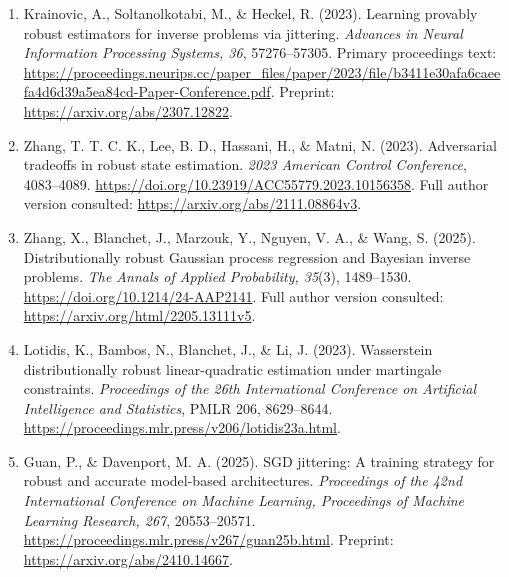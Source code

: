\documentclass[11pt,a4paper]{article}
\begin{document}
\begin{enumerate}
\def\labelenumi{\arabic{enumi}.}
\item
  Krainovic, A., Soltanolkotabi, M., \& Heckel, R. (2023). Learning
  provably robust estimators for inverse problems via jittering.
  \emph{Advances in Neural Information Processing Systems, 36},
  57276--57305. Primary proceedings text:
  \url{https://proceedings.neurips.cc/paper_files/paper/2023/file/b3411e30afa6caeefa4d6d39a5ea84cd-Paper-Conference.pdf}.
  Preprint: \url{https://arxiv.org/abs/2307.12822}.
\item
  Zhang, T. T. C. K., Lee, B. D., Hassani, H., \& Matni, N. (2023).
  Adversarial tradeoffs in robust state estimation. \emph{2023 American
  Control Conference}, 4083--4089.
  \url{https://doi.org/10.23919/ACC55779.2023.10156358}. Full author
  version consulted: \url{https://arxiv.org/abs/2111.08864v3}.
\item
  Zhang, X., Blanchet, J., Marzouk, Y., Nguyen, V. A., \& Wang, S.
  (2025). Distributionally robust Gaussian process regression and
  Bayesian inverse problems. \emph{The Annals of Applied Probability,
  35}(3), 1489--1530. \url{https://doi.org/10.1214/24-AAP2141}. Full
  author version consulted: \url{https://arxiv.org/html/2205.13111v5}.
\item
  Lotidis, K., Bambos, N., Blanchet, J., \& Li, J. (2023). Wasserstein
  distributionally robust linear-quadratic estimation under martingale
  constraints. \emph{Proceedings of the 26th International Conference on
  Artificial Intelligence and Statistics}, PMLR 206, 8629--8644.
  \url{https://proceedings.mlr.press/v206/lotidis23a.html}.
\item
  Guan, P., \& Davenport, M. A. (2025). SGD jittering: A training strategy
  for robust and accurate model-based architectures. \emph{Proceedings of
  the 42nd International Conference on Machine Learning, Proceedings of
  Machine Learning Research, 267}, 20553--20571.
  \url{https://proceedings.mlr.press/v267/guan25b.html}. Preprint:
  \url{https://arxiv.org/abs/2410.14667}.
\end{enumerate}
\end{document}
